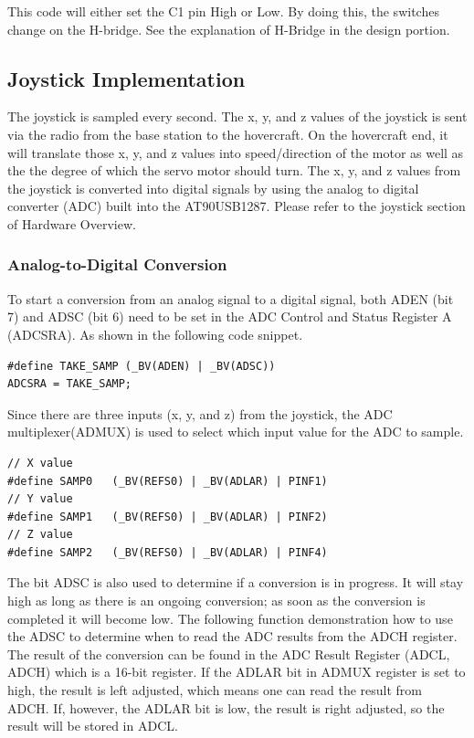 This code will either set the C1 pin High or Low. By doing this, the switches change on the H-bridge. See the explanation of H-Bridge in the design portion. 

\subsection{Joystick Implementation}
The joystick is sampled every second. The x, y, and z values of the joystick is sent via the radio from the base station to the hovercraft. On the hovercraft end, it will translate those x, y, and z values into speed/direction of the motor as well as the the degree of which the servo motor should turn. The x, y, and z values from the joystick is converted into digital signals by using the analog to digital converter (ADC) built into the AT90USB1287. Please refer to the joystick section of Hardware Overview.

\subsubsection{Analog-to-Digital Conversion}
To start a conversion from an analog signal to a digital signal, both ADEN (bit 7) and ADSC (bit 6) need to be set in the ADC Control and Status Register A (ADCSRA). As shown in the following code snippet.
\begin{lstlisting}
#define TAKE_SAMP (_BV(ADEN) | _BV(ADSC))
ADCSRA = TAKE_SAMP;
\end{lstlisting}

Since there are three inputs (x, y, and z) from the joystick,  the ADC multiplexer(ADMUX) is used to select which input value for the ADC to sample.

\begin{lstlisting}
// X value
#define SAMP0 	(_BV(REFS0) | _BV(ADLAR) | PINF1)
// Y value
#define SAMP1 	(_BV(REFS0) | _BV(ADLAR) | PINF2)
// Z value
#define SAMP2 	(_BV(REFS0) | _BV(ADLAR) | PINF4)
\end{lstlisting}

The bit ADSC is also used to determine if a conversion is in progress. It will stay high as long as there is an ongoing conversion; as soon as the conversion is completed it will become low. The following function demonstration how to use the ADSC to determine when to read the ADC results from the ADCH register. The result of the conversion can be found in the ADC Result Register (ADCL, ADCH) which is a 16-bit register. If the ADLAR bit in ADMUX register is set to high, the result is left adjusted, which means one can read the result from ADCH. If, however, the ADLAR bit is low, the result is right adjusted, so the result will be stored in ADCL.

